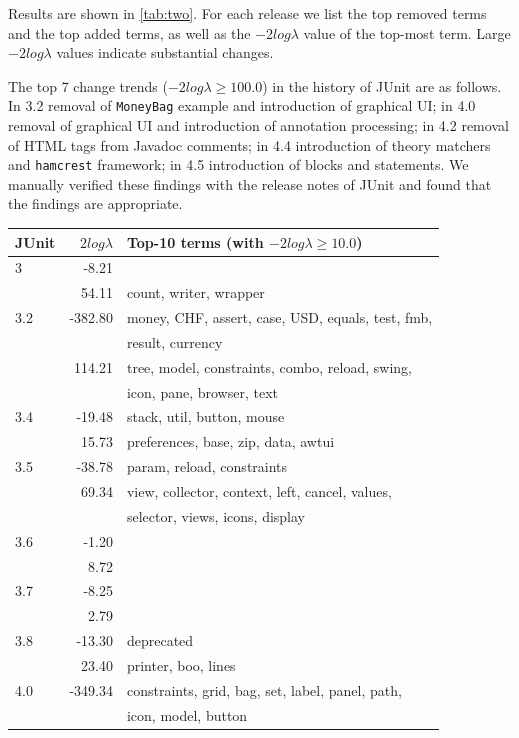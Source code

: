 \documentclass[10pt]{book}
\begin{document}
Results are shown in \autoref{tab:two}. For each release we list the top removed terms and the top added terms, as well as the $-2log\lambda$ value of the top-most term. Large $-2log\lambda$ values indicate substantial changes.

The top 7 change trends (\ie $-2log\lambda \geqslant 100.0$) in the history of JUnit are as follows. In 3.2 removal of \verb$MoneyBag$ example and introduction of graphical UI; in 4.0 removal of graphical UI and introduction of annotation processing; in 4.2 removal of HTML tags from Javadoc comments; in 4.4 introduction of theory matchers and \verb$hamcrest$ framework; in 4.5 introduction of blocks and statements. We manually verified these findings with the release notes of JUnit and found that the findings are appropriate.
 
\begin{table}
{\scriptsize \begin{center}
\begin{tabular}{lrl}
\textbf{JUnit} & $2log\lambda$ & \textbf{Top-10 terms (with $-2log\lambda \geqslant10.0$)} \\
\hline
3 & -8.21 &  \\
~ & 54.11 & count, writer, wrapper \\
\hline
3.2 & -382.80 & money, CHF, assert, case, USD, equals, test, fmb,\\~&~& result, currency \\
~ & 114.21 & tree, model, constraints, combo, reload, swing,\\~&~& icon, pane, browser, text \\
\hline
3.4 & -19.48 & stack, util, button, mouse \\
~ & 15.73 & preferences, base, zip, data, awtui \\
\hline
3.5 & -38.78 & param, reload, constraints \\
~ & 69.34 & view, collector, context, left, cancel, values,\\~&~& selector, views, icons, display \\
\hline
3.6 & -1.20 &  \\
~ & 8.72 &  \\
\hline
3.7 & -8.25 &  \\
~ & 2.79 &  \\
\hline
3.8 & -13.30 & deprecated \\
~ & 23.40 & printer, boo, lines \\
\hline
4.0 & -349.34 & constraints, grid, bag, set, label, panel, path,\\~&~& icon, model, button \\

\end{tabular}
\end{center}}
\end{table}
\end{document}

